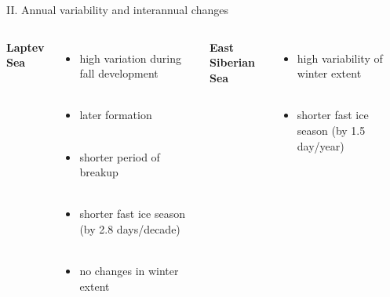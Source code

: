 \documentclass[8pt]{beamer}
\begin{document}
\setwatermark{\fontsize{125pt}{125pt}\selectfont{}}
\begin{frame}[fragile]{II. Annual variability and interannual changes}
\begin{columns}
	\centering
	\textbf{Laptev Sea}\\~\\
		\begin{itemize}
			\item high variation during fall development\\~\\
			\item later formation\\~\\
			\item shorter period of breakup\\~\\
			\item shorter fast ice season (by 2.8 days/decade)\\~\\
			\item no changes in winter extent\\~\\
		\end{itemize}
	
		\centering
	\textbf{East Siberian Sea}\\~\\
	\begin{itemize}
		\item high variability of winter extent\\~\\
		\item shorter fast ice season (by 1.5 day/year) 
	\end{itemize}
\end{columns}
\end{frame}
\end{document}
